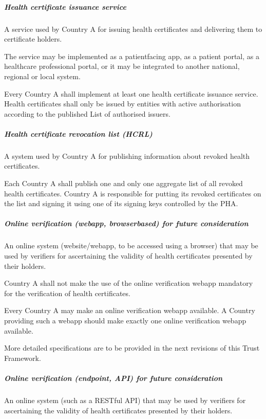 \documentclass[a4paper,12pt,english]{sphinxhowto}
\begin{document}
\subparagraph{Health certificate issuance service}
\label{\detokenize{ssi/annotehealth:health-certificate-issuance-service}}
\sphinxAtStartPar
A service used by Country A for issuing health certificates and delivering them to certificate holders.

\sphinxAtStartPar
The service may be implemented as a patient\sphinxhyphen{}facing app, as a patient portal, as a healthcare professional portal, or it may be integrated to another national, regional or local system.

\sphinxAtStartPar
Every Country A shall implement at least one health certificate issuance service. Health certificates shall only be issued by entities with active authorisation according to the published List of authorised issuers.


\subparagraph{Health certificate revocation list (HCRL)}
\label{\detokenize{ssi/annotehealth:health-certificate-revocation-list-hcrl}}
\sphinxAtStartPar
A system used by Country A for publishing information about revoked health certificates.

\sphinxAtStartPar
Each Country A shall publish one and only one aggregate list of all revoked health certificates. Country A is responsible for putting its revoked certificates on the list and signing it using one of its signing keys controlled by the PHA.


\subparagraph{Online verification (webapp, browser\sphinxhyphen{}based) \textendash{} for future consideration}
\label{\detokenize{ssi/annotehealth:online-verification-webapp-browser-based-for-future-consideration}}
\sphinxAtStartPar
An online system (website/webapp, to be accessed using a browser) that may be used by verifiers for ascertaining the validity of health certificates presented by their holders.

\sphinxAtStartPar
Country A shall not make the use of the online verification webapp mandatory for the verification of health certificates.

\sphinxAtStartPar
Every Country A may make an online verification webapp available. A Country providing such a webapp should make exactly one online verification webapp available.

\sphinxAtStartPar
More detailed specifications are to be provided in the next revisions of this Trust Framework.


\subparagraph{Online verification (endpoint, API) \textendash{} for future consideration}
\label{\detokenize{ssi/annotehealth:online-verification-endpoint-api-for-future-consideration}}
\sphinxAtStartPar
An online system (such as a RESTful API) that may be used by verifiers for ascertaining the validity of health certificates presented by their holders.
\end{document}

